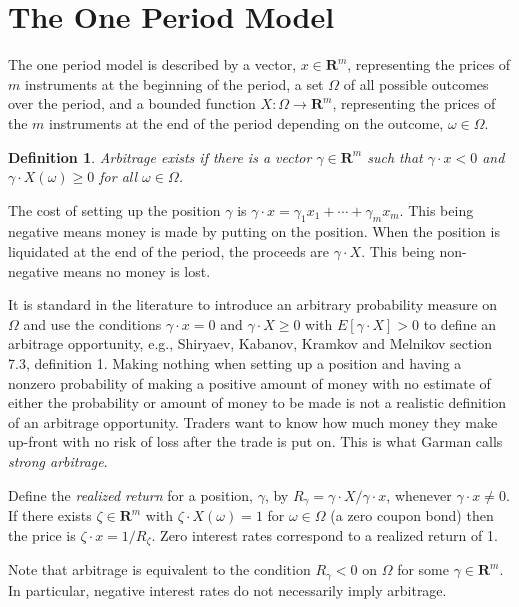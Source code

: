 \documentclass[fleqn]{amsart}
\newcommand{\R}{\mathbf{R}}
\newtheorem{definition}{Definition}[section]
\begin{document}
\section{The One Period Model}
The one period model is described by a vector, $x\in\R^m$, representing
the prices of $m$ instruments at the beginning of the period, a set
$\Omega$ of all possible outcomes over the period, and a bounded function
$X\colon\Omega\to\R^m$, representing the prices of the $m$ instruments
at the end of the period depending on the outcome, $\omega\in\Omega$.

\begin{definition}
Arbitrage exists if there is a vector $\gamma\in\R^m$ such that
$\gamma\cdot x < 0$ and $\gamma\cdot X(\omega)\ge0$ for all $\omega\in\Omega$.
\end{definition}

The cost of setting up the position $\gamma$ is
$\gamma\cdot x = \gamma_1 x_1 + \cdots + \gamma_m x_m$.
This being negative means money is made
by putting on the position. When the position is liquidated at the end
of the period, the proceeds are $\gamma\cdot X$. This being non-negative
means no money is lost.

It is standard in the literature to introduce an arbitrary probability
measure on $\Omega$ and use the conditions $\gamma\cdot x = 0$ and 
$\gamma\cdot X\ge0$ with $E[\gamma\cdot X]>0$
to define an arbitrage opportunity, e.g.,
Shiryaev, Kabanov, Kramkov and Melnikov \cite{ShiKabKraMel1994}
section 7.3, definition 1.  Making nothing
when setting up a position and having a nonzero probability of making a
positive amount of money with no estimate of either the probability or
amount of money to be made is not a realistic definition of an arbitrage
opportunity.  Traders want to know how much money they make up-front
with no risk of loss after the trade is put on.  %
This is what Garman \cite{Gar1985} calls {\em strong arbitrage}.

Define the \emph{realized return} for a position, $\gamma$, by
$R_\gamma = \gamma\cdot X/\gamma\cdot x$,
whenever $\gamma\cdot x\not=0$. If there exists $\zeta\in\R^m$
with $\zeta\cdot X(\omega) = 1$ for $\omega\in\Omega$ (a 
zero coupon bond) then the price is $\zeta\cdot x = 1/R_\zeta$.
Zero interest rates correspond to a realized return of 1.

Note that arbitrage is equivalent to
the condition $R_\gamma < 0$ on $\Omega$ for some $\gamma\in\R^m$.
In particular, negative interest rates do not necessarily imply arbitrage. 
\end{document}

